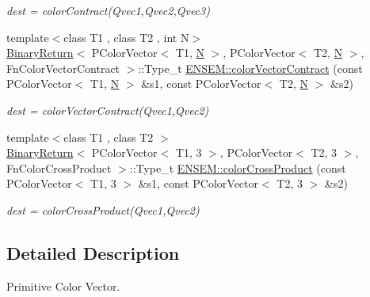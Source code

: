 \begin{DoxyCompactItemize}
\begin{DoxyCompactList}\small\item\em dest = color\+Contract(\+Qvec1,\+Qvec2,\+Qvec3) \end{DoxyCompactList}\item 
{\footnotesize template$<$class T1 , class T2 , int N$>$ }\\\mbox{\hyperlink{structBinaryReturn}{Binary\+Return}}$<$ P\+Color\+Vector$<$ T1, \mbox{\hyperlink{adat__devel_2lib_2hadron_2operator__name__util_8cc_a7722c8ecbb62d99aee7ce68b1752f337}{N}} $>$, P\+Color\+Vector$<$ T2, \mbox{\hyperlink{adat__devel_2lib_2hadron_2operator__name__util_8cc_a7722c8ecbb62d99aee7ce68b1752f337}{N}} $>$, Fn\+Color\+Vector\+Contract $>$\+::Type\+\_\+t \mbox{\hyperlink{namespaceENSEM_a666da055f6c28926add4d2570dc0e679}{E\+N\+S\+E\+M\+::color\+Vector\+Contract}} (const P\+Color\+Vector$<$ T1, \mbox{\hyperlink{adat__devel_2lib_2hadron_2operator__name__util_8cc_a7722c8ecbb62d99aee7ce68b1752f337}{N}} $>$ \&s1, const P\+Color\+Vector$<$ T2, \mbox{\hyperlink{adat__devel_2lib_2hadron_2operator__name__util_8cc_a7722c8ecbb62d99aee7ce68b1752f337}{N}} $>$ \&s2)
\begin{DoxyCompactList}\small\item\em dest = color\+Vector\+Contract(\+Qvec1,\+Qvec2) \end{DoxyCompactList}\item 
{\footnotesize template$<$class T1 , class T2 $>$ }\\\mbox{\hyperlink{structBinaryReturn}{Binary\+Return}}$<$ P\+Color\+Vector$<$ T1, 3 $>$, P\+Color\+Vector$<$ T2, 3 $>$, Fn\+Color\+Cross\+Product $>$\+::Type\+\_\+t \mbox{\hyperlink{namespaceENSEM_a04433b1f7fdd4c3af3311092895168d7}{E\+N\+S\+E\+M\+::color\+Cross\+Product}} (const P\+Color\+Vector$<$ T1, 3 $>$ \&s1, const P\+Color\+Vector$<$ T2, 3 $>$ \&s2)
\begin{DoxyCompactList}\small\item\em dest = color\+Cross\+Product(\+Qvec1,\+Qvec2) \end{DoxyCompactList}\end{DoxyCompactItemize}


\subsection{Detailed Description}
Primitive Color Vector. 

